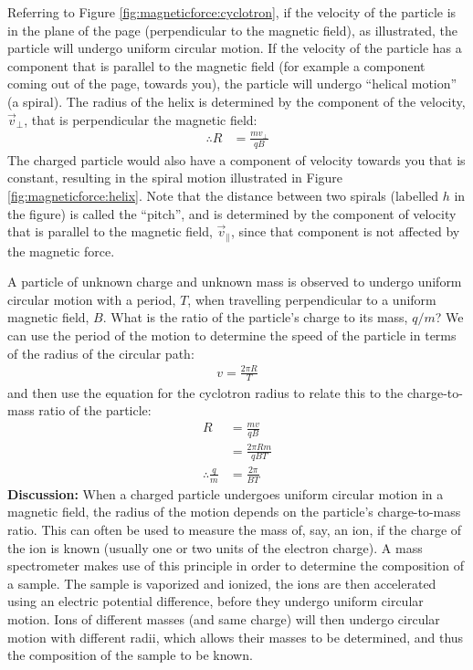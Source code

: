 Referring to Figure \ref{fig:magneticforce:cyclotron}, if the velocity of the particle is in the plane of the page (perpendicular to the magnetic field), as illustrated, the particle will undergo uniform circular motion. If the velocity of the particle has a component that is parallel to the magnetic field (for example a component coming out of the page, towards you), the particle will undergo ``helical motion'' (a spiral). The radius of the helix is determined by the component of the velocity, $\vec v_{\perp}$, that is perpendicular the magnetic field:
\begin{align*}
\therefore R &= \frac{mv_{\perp}}{qB}
\end{align*}
The charged particle would also have a component of velocity towards you that is constant, resulting in the spiral motion illustrated in Figure \ref{fig:magneticforce:helix}. Note that the distance between two spirals (labelled $h$ in the figure) is called the ``pitch'', and is determined by the component of velocity that is parallel to the magnetic field, $\vec v_\parallel$, since that component is not affected by the magnetic force. 
\begin{example}{\label{ex:magneticforce:massspec}A particle of unknown charge and unknown mass is observed to undergo uniform circular motion with a period, $T$, when travelling perpendicular to a uniform magnetic field, $B$. What is the ratio of the particle's charge to its mass, $q/m$? }
We can use the period of the motion to determine the speed of the particle in terms of the radius of the circular path:
\begin{align*}
v = \frac{2\pi R}{T}
\end{align*}
and then use the equation for the cyclotron radius to relate this to the charge-to-mass ratio of the particle:
\begin{align*}
R &= \frac{mv}{qB}\\
  &= \frac{2\pi R m}{qBT}\\
\therefore \frac{q}{m} &= \frac{2\pi}{BT} 
\end{align*}
\textbf{Discussion:} When a charged particle undergoes uniform circular motion in a magnetic field, the radius of the motion depends on the particle's charge-to-mass ratio. This can often be used to measure the mass of, say, an ion, if the charge of the ion is known (usually one or two units of the electron charge). A mass spectrometer makes use of this principle in order to determine the composition of a sample. The sample is vaporized and ionized, the ions are then accelerated using an electric potential difference, before they undergo uniform circular motion. Ions of different masses (and same charge) will then undergo circular motion with different radii, which allows their masses to be determined, and thus the composition of the sample to be known.
\end{example}

